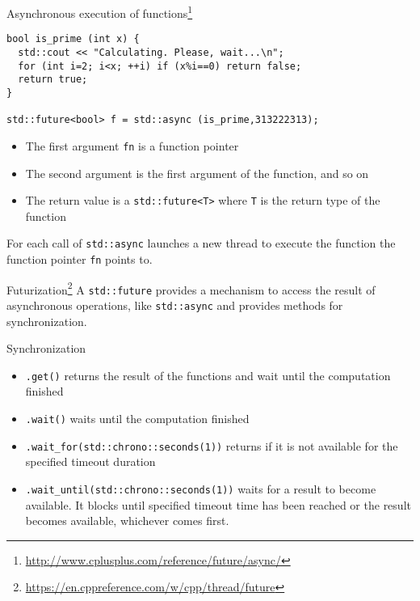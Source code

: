 \documentclass[12pt,t]{beamer}
\begin{document}
\begin{frame}[fragile]{Asynchronous execution of functions\footnote{\tiny\url{http://www.cplusplus.com/reference/future/async/}}}

\begin{lstlisting}
bool is_prime (int x) {
  std::cout << "Calculating. Please, wait...\n";
  for (int i=2; i<x; ++i) if (x%i==0) return false;
  return true;
}

std::future<bool> f = std::async (is_prime,313222313);

\end{lstlisting}

\begin{itemize}
\item The first argument \lstinline|fn| is a function pointer
\item The second argument is the first argument of the function, and so on
\item The return value is a \lstinline|std::future<T>| where \lstinline|T| is the return type of the function
\end{itemize}
For each call of \lstinline|std::async| launches a new thread to execute the function the function pointer \lstinline|fn| points to. 
\end{frame}


\begin{frame}{Futurization\footnote{\tiny\url{https://en.cppreference.com/w/cpp/thread/future}}}
A \lstinline|std::future| provides a mechanism to access the result of asynchronous operations, like \lstinline|std::async| and provides methods for synchronization.

\begin{block}{Synchronization}

\begin{itemize}
\item \lstinline|.get()| returns the result of the functions and wait until the computation finished
\item \lstinline|.wait()| waits until the computation finished
\item \lstinline|.wait_for(std::chrono::seconds(1))| returns if it is not available for the specified timeout duration 
\item \lstinline|.wait_until(std::chrono::seconds(1))| waits for a result to become available. It blocks until specified timeout time has been reached or the result becomes available, whichever comes first. 
\end{itemize}

\end{block}
\end{frame}
\end{document}
